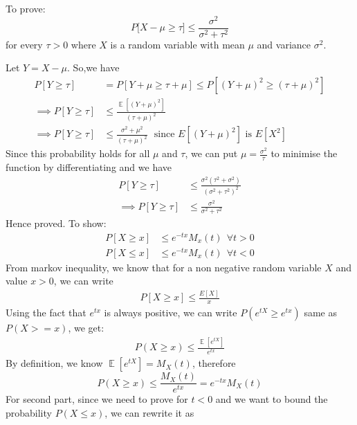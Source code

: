 \begin{solution}
 To prove:
 \begin{equation}
     P\big[X- \mu \geq \tau \big] \leq \frac{\sigma^2}{\sigma^2+\tau^2}
 \end{equation}
for every $\tau >0$ where $X$ is a random variable with mean $\mu$ and variance $\sigma^2$. \\
\par Let $Y=X-\mu$. So,we have 
\begin{align}
    P[Y\geq \tau]&=P[Y+\mu \geq \tau+\mu] \leq P[(Y+\mu)^2\geq (\tau+\mu)^2]\\
    \implies P[Y\geq \tau]&\leq \frac{\mathop{\mathbb{E}}[(Y+\mu)^2]}{(\tau+\mu)^2} \\
    \implies P[Y\geq \tau]&\leq \frac{\sigma^2+\mu^2}{(\tau+\mu)^2} \:\:\: \text{since $E[(Y+\mu)^2]$ is $E[X^2]$} 
\end{align}
Since this probability holds for all $\mu$ and $\tau$, we can put $\mu=\frac{\sigma^2}{\tau}$ to minimise the function by differentiating and we have
\begin{align}
    P[Y\geq \tau]& \leq \frac{\sigma^{2}(\tau^2+\sigma^2)}{(\sigma^2+\tau^2)^2}\\
    \implies P[Y\geq \tau]& \leq \frac{\sigma^{2}}{\sigma^2+\tau^2}
\end{align}
Hence proved.
 To show:
 \begin{align}
     P[X\geq x]&\leq e^{-tx}M_{x}(t) \:\:\forall t>0 \\
     P[X\leq x]&\leq e^{-tx}M_{x}(t) \:\:\forall t<0     
 \end{align}
 From markov inequality, we know that for a non negative random variable $X$ and value $x>0$, we can write  
 \begin{align}
     P[X\geq x]\leq \frac{E[X]}{x}
 \end{align}
 Using the fact that $e^{tx}$ is always positive, we can write $P(e^{tX}\geq e^{tx})$ same as $P(X>=x)$, we get:
 \begin{align}
     P(X\geq x)\leq \frac{\mathop{\mathbb{E}}[e^{tX}]}{e^{tx}}
 \end{align}
 By definition, we know $\mathop{\mathbb{E}}[e^{tX}]=M_{X}(t)$, therefore
 \begin{equation}
      P(X\geq x)\leq \frac{M_{X}(t)}{e^{tx}}=e^{-tx}M_{X}(t)
 \end{equation}
 For second part, since we need to prove for $t<0$ and we want to bound the probability $P(X\leq x)$, we can rewrite it as 
 \begin{equation}

\end{equation}
\end{solution}
